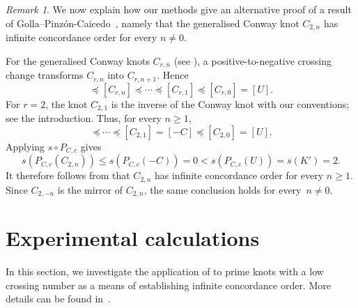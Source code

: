 \documentclass{amsart}
\let\cref\Cref
\theoremstyle{remark}
\newtheorem{remark}[theorem]{Remark}
\begin{document}
\begin{remark}\label{rem:generalised_Conway_knots}
We now explain how our methods give an alternative proof of a result of Golla--Pinzón-Caicedo~\cite[Theorem~1.3]{golla_pinzon-caicedo}, namely that the generalised Conway knot $C_{2,n}$ has infinite concordance order for every $n\neq 0$.

For the generalised Conway knots $C_{r,n}$ (see \cite[Figure~2]{golla_pinzon-caicedo}), a positive-to-negative crossing change transforms $C_{r,n}$ into $C_{r,n+1}$. Hence
\begin{equation*}
[C_{r,n+1}] \preceq [C_{r,n}] \preceq \cdots \preceq [C_{r,1}] \preceq [C_{r,0}]=[U].
\end{equation*}
For $r=2$, the knot $C_{2,1}$ is the inverse of the Conway knot with our conventions; see the introduction. Thus, for every $n\geq 1$,
\begin{equation*}
[C_{2,n}] \preceq \cdots \preceq [C_{2,1}]=[-C]\preceq [C_{2,0}]=[U].
\end{equation*}
Applying $s\circ P_{C,c}$ gives
\begin{equation*}
s(P_{C,c}(C_{2,n}))
\leq s(P_{C,c}(-C))
=0
<s(P_{C,c}(U))
=s(K')
=2.
\end{equation*}
It therefore follows from  that $C_{2,n}$ has infinite concordance order for every $n\geq 1$. Since $C_{2,-n}$ is the mirror of $C_{2,n}$, the same conclusion holds for every~$n\neq 0$.
\end{remark}

\section{Experimental calculations}\label{sec:experiments}

In this section, we investigate the application of \cref{thm:main_detailed} to prime knots with a low crossing number as a means of establishing infinite concordance order. More details can be found in~\cite{data}.
\end{document}
